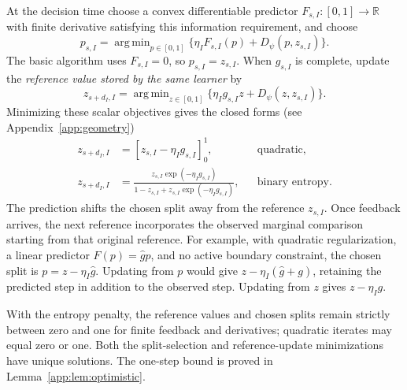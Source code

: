 \documentclass[11pt]{article}
\DeclareMathOperator*{\argmin}{arg\,min}
\newcommand{\Real}{\mathbb{R}}
\theoremstyle{plain}
\theoremstyle{remark}
\numberwithin{equation}{section}
\begin{document}
At the decision time choose a convex differentiable predictor
$F_{s,I}:[0,1]\to\Real$ with finite derivative satisfying this information
requirement, and choose
\begin{equation}\label{ch6:eq:play}
 p_{s,I}=\argmin_{p\in[0,1]}
 \{\eta_IF_{s,I}(p)+{D_\psi}(p,z_{s,I})\}.
\end{equation}
The basic algorithm uses $F_{s,I}=0$, so $p_{s,I}=z_{s,I}$.
When $g_{s,I}$ is complete, update the \emph{reference value stored by the same learner} by
\begin{equation}\label{ch6:eq:correct}
 z_{s+d_I,I}=\argmin_{z\in[0,1]}
 \{\eta_Ig_{s,I}z+{D_\psi}(z,z_{s,I})\}.
\end{equation}
Minimizing these scalar objectives gives the closed forms
(see Appendix~\ref{app:geometry})
\begin{align}
 z_{s+d_I,I}&=[z_{s,I}-\eta_Ig_{s,I}]_0^1,&&\text{quadratic},\label{ch6:eq:quad}\\
 z_{s+d_I,I}&=\frac{z_{s,I}\exp(-\eta_Ig_{s,I})}
 {1-z_{s,I}+z_{s,I}\exp(-\eta_Ig_{s,I})},&&\text{binary entropy}.\label{ch6:eq:entropy}
\end{align}
The prediction shifts the chosen split away from the reference $z_{s,I}$.
Once feedback arrives, the next reference incorporates the observed
marginal comparison starting from that original reference. For example,
with quadratic regularization, a linear predictor $F(p)=\widehat g p$,
and no active boundary constraint, the chosen split is
$p=z-\eta_I\widehat g$. Updating from $p$ would give
$z-\eta_I(\widehat g+g)$, retaining the predicted step in addition to the
observed step. Updating from $z$ gives $z-\eta_Ig$.

With the entropy penalty, the reference values and chosen splits remain strictly between zero and one for finite feedback and derivatives;
quadratic iterates may equal zero or one. Both the split-selection and reference-update minimizations have
unique solutions. The one-step bound is proved in
Lemma~\ref{app:lem:optimistic}.
\end{document}
